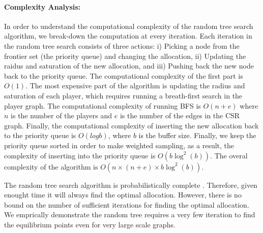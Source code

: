 \paragraph{Complexity Analysis:}
In order to understand the computational complexity of the random tree search algorithm, we break-down the computation at every iteration. Each iteration in the random tree search consists of three actions:
i) Picking a node from the frontier set (the priority queue) and changing the allocation,
ii) Updating the raidus and saturation of the new allocation, and
iii) Pushing back the new node back to the priority queue.
The computational complexity of the first part is $O(1)$. The most expensive part of the algorithm is updating the radius and saturation of each player, which requires running a breath-first search in the player graph. The computational complexity of running BFS is $O(n+e)$ where $n$ is the number of the players and $e$ is the number of the edges in the CSR graph. Finally, the computational complexity of inserting the new allocation back to the priority queue is $O(log b)$, where $b$ is the buffer size. Finally, we keep the priority queue sorted in order to make weighted sampling, as a result, the complexity of inserting into the priority queue is $O(b\log^2(b))$. The overal complexity of the algorithm is $O(n\times(n+e)\times b\log^2(b))$.

The random tree search algorithm is probabilistically complete \cite{Lavalle2006}. Therefore, given enought time it will always find the optimal allocation. However, there is no bound on the number of sufficient iterations for finding the optimal allocation. We emprically demonstrate the random tree requires a very few iteration to find the equilibrium points even for very large scale graphs.
